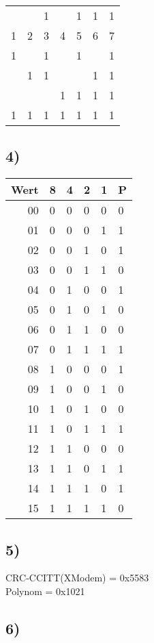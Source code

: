 \documentclass[]{article}
\begin{document}
\begin{longtable}[l]{@{}lllllll@{}}
	\toprule
	 & &1& &1&1&1\\
	1&2&3&4&5&6&7\\
	\endhead
	\midrule
	1& &1& &1& &1\\
	 &1&1& & &1&1\\
	 & & &1&1&1&1\\
	\hline
	1&1&1&1&1&1&1\\
	\bottomrule
\end{longtable}

\subsection{4)}\label{Aufgabe 5}

\begin{longtable}[l]{@{}r|lllll@{}}
	\toprule
	Wert&8&4&2&1&P\\
	\endhead
	\midrule
	00&0&0&0&0&0\\
	01&0&0&0&1&1\\
	02&0&0&1&0&1\\
	03&0&0&1&1&0\\
	04&0&1&0&0&1\\
	05&0&1&0&1&0\\
	06&0&1&1&0&0\\
	07&0&1&1&1&1\\
	08&1&0&0&0&1\\
	09&1&0&0&1&0\\
	10&1&0&1&0&0\\
	11&1&0&1&1&1\\
	12&1&1&0&0&0\\
	13&1&1&0&1&1\\
	14&1&1&1&0&1\\
	15&1&1&1&1&0\\
	\bottomrule
\end{longtable}

\subsection{5)}\label{5}

CRC-CCITT(XModem) = 0x5583\\
Polynom = 0x1021

\subsection{6)}\label{6}
\end{document}

